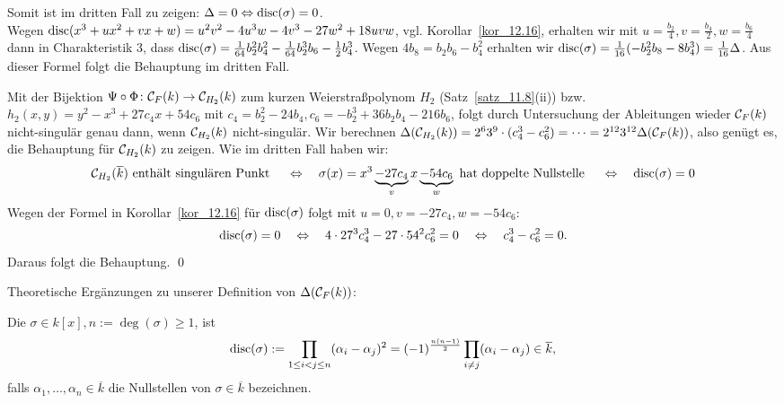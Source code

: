 \begin{bew}[Fortsetzung]
	Somit ist im dritten Fall zu zeigen: $\Delta = 0 \Leftrightarrow \operatorname{disc}(\sigma)=0$. \\
	Wegen $\operatorname{disc}(x^3 + ux^2 + vx + w) = u^2v^2 - 4u^3w - 4v^3 - 27w^2 + 18uvw$, vgl. Korollar~\ref{kor_12.16}, erhalten wir mit $u = \frac{b_2}{4}, v = \frac{b_4}{2}, w= \frac{b_6}{4}$ dann in Charakteristik $3$, dass $\operatorname{disc}(\sigma) = \frac{1}{64} b_2^2 b_4^2 - \frac{1}{64} b_2^3 b_6 - \frac{1}{2} b_4^3$. 
	Wegen $4 b_8 = b_2 b_6 - b_4^2$ erhalten wir $\operatorname{disc}(\sigma) = \frac{1}{16} (-b_2^2b_8 - 8b_4^3) = \frac{1}{16} \Delta$. 
	Aus dieser Formel folgt die Behauptung im dritten Fall.
\end{bew}

\begin{bew}[4. Fall: $\Char(k) > 3$ oder $\Char(k) = 0$]
	Mit der Bijektion $\Psi \circ \Phi \colon \mathcal{C}_F(k) \rightarrow \mathcal{C}_{H_2}(k)$ zum kurzen Weierstraßpolynom $H_2$ (Satz~\ref{satz_11.8}(ii)) bzw. $h_2(x,y) = y^2 - x^3 + 27c_4x + 54c_6$ mit $c_4 = b_2^2 - 24b_4, c_6 = -b_2^3 + 36b_2 b_4 - 216 b_6$, folgt durch Untersuchung der Ableitungen wieder $\mathcal{C}_F(k)$ nicht-singulär genau dann, wenn $\mathcal{C}_{H_2}(k)$ nicht-singulär. 
	Wir berechnen $\Delta(\mathcal{C}_{H_2}(k)) = 2^6 3^9 \cdot (c_4^3-c_6^2) = \dots = 2^{12} 3^{12} \Delta(\mathcal{C}_F(k))$, also genügt es, die Behauptung für $\mathcal{C}_{H_2}(k)$ zu zeigen. 
	Wie im dritten Fall haben wir:
	\[ \mathcal{C}_{H_2}(\overline{k}) \text{ enthält singulären Punkt } \quad \Leftrightarrow \quad \sigma(x) = x^3 \underbrace{- 27c_4}_{v} x \underbrace{- 54 c_6}_{w} \text{ hat doppelte Nullstelle } \quad \Leftrightarrow \quad \operatorname{disc}(\sigma)=0 \]
	Wegen der Formel in Korollar~\ref{kor_12.16} für $\operatorname{disc}(\sigma)$ folgt mit $u = 0, v = -27c_4, w= - 54c_6$:
	\[ \operatorname{disc}(\sigma) = 0 \quad \Leftrightarrow \quad 4 \cdot 27^3 c_4^3 - 27 \cdot 54^2 c_6^2 = 0 \quad \Leftrightarrow \quad c_4^3 - c_6^2 = 0. \]
	Daraus folgt die Behauptung. \qed
\end{bew}

Theoretische Ergänzungen zu unserer Definition von $\Delta(\mathcal{C}_F(k))$:
\begin{defn}
	Die  $\sigma \in k[x], n := \deg(\sigma) \geq 1$, ist 
	\[ \operatorname{disc}(\sigma) := \prod_{1 \leq i < j \leq n} (\alpha_i - \alpha_j)^2 = (-1)^{\frac{n(n-1)}{2}} \prod_{i \neq j} (\alpha_i - \alpha_j) \in \overline{k},\]
	falls $\alpha_1, \dots, \alpha_n \in \overline{k}$ die Nullstellen von $\sigma \in \overline{k}$ bezeichnen.
\end{defn}

